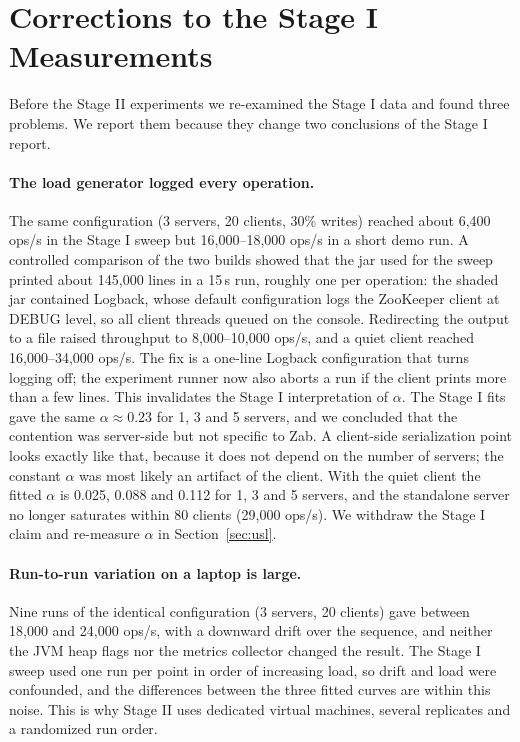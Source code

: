 
\section{Corrections to the Stage I Measurements}
\label{sec:corrections}

Before the Stage II experiments we re-examined the Stage I data and found three problems. We report them because
they change two conclusions of the Stage I report.

\paragraph{The load generator logged every operation.}
The same configuration (3 servers, 20 clients, 30\% writes) reached about 6{,}400 ops/s in the Stage I sweep but
16{,}000--18{,}000 ops/s in a short demo run. A controlled comparison of the two builds showed that the jar used for the sweep
printed about 145{,}000 lines in a 15\,s run, roughly one per operation: the shaded jar contained Logback, whose
default configuration logs the ZooKeeper client at DEBUG level, so all client threads queued on the console.
Redirecting the output to a file raised throughput to 8{,}000--10{,}000 ops/s, and a quiet client reached
16{,}000--34{,}000 ops/s. The fix is a one-line Logback configuration that turns logging off; the experiment runner
now also aborts a run if the client prints more than a few lines.
This invalidates the Stage I interpretation of $\alpha$. The Stage I fits gave the same $\alpha\approx0.23$ for 1, 3 and
5 servers, and we concluded that the contention was server-side but not specific to Zab. A client-side
serialization point looks exactly like that, because it does not depend on the number of servers; the constant $\alpha$
was most likely an artifact of the client. With the quiet client the fitted $\alpha$ is 0.025, 0.088 and 0.112 for
1, 3 and 5 servers, and the standalone server no longer saturates within 80 clients (29{,}000 ops/s). We
withdraw the Stage I claim and re-measure $\alpha$ in Section~\ref{sec:usl}.

\paragraph{Run-to-run variation on a laptop is large.}
Nine runs of the identical configuration (3 servers, 20 clients) gave between 18{,}000 and 24{,}000 ops/s, with a
downward drift over the sequence, and neither the JVM heap flags nor the metrics collector changed the result.
The Stage I sweep used one run per point in order of increasing load, so drift and load were confounded, and the
differences between the three fitted curves are within this noise. This is why Stage II uses dedicated virtual
machines, several replicates and a randomized run order.

